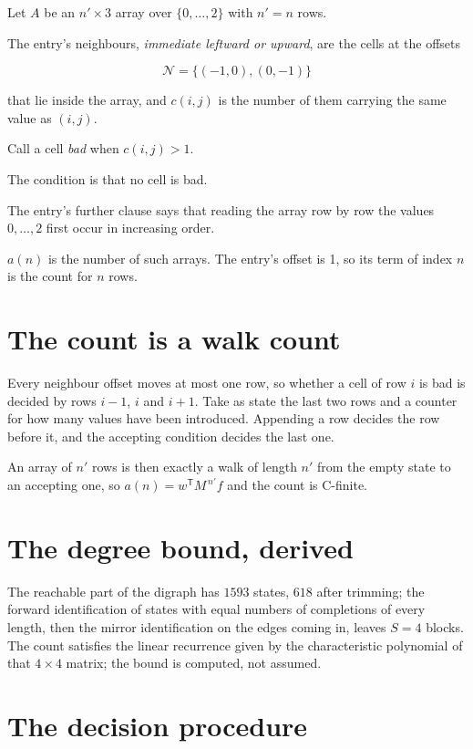 \documentclass[11pt]{article}
\theoremstyle{definition}
\begin{document}
Let $A$ be an $n' \times 3$ array over $\{0,\dots,2\}$ with $n' = n$ rows.

The entry's neighbours, {\itshape immediate leftward or upward}, are the cells at the offsets

\[\mathcal{N} = \{(-1,0), (0,-1)\}\]

that lie inside the array, and $c(i,j)$ is the number of them carrying the same value as $(i,j)$.

Call a cell {\itshape bad} when $c(i,j) > 1$.

The condition is that no cell is bad.

The entry's further clause says that reading the array row by row the values $0,\dots,2$ first occur in increasing order.

$a(n)$ is the number of such arrays. The entry's offset is 1, so its term of index $n$ is the count for $n$ rows.

\section{The count is a walk count}

Every neighbour offset moves at most one row, so whether a cell of row $i$ is bad is decided by rows $i-1$, $i$ and $i+1$. Take as state the last two rows and a counter for how many values have been introduced. Appending a row decides the row before it, and the accepting condition decides the last one.

An array of $n'$ rows is then exactly a walk of length $n'$ from the empty state to an accepting one, so $a(n) = w^{\mathsf T}M^{\,n'}f$ and the count is C-finite.

\section{The degree bound, derived}

The reachable part of the digraph has $1593$ states, $618$ after trimming; the forward identification of states with equal numbers of completions of every length, then the mirror identification on the edges coming in, leaves $S = 4$ blocks. The count satisfies the linear recurrence given by the characteristic polynomial of that $4\times4$ matrix; the bound is computed, not assumed.

\section{The decision procedure}
\end{document}
